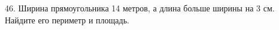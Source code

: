 46. Ширина прямоугольника 14 метров, а длина больше ширины на 3 см. Найдите его периметр и площадь.\\
